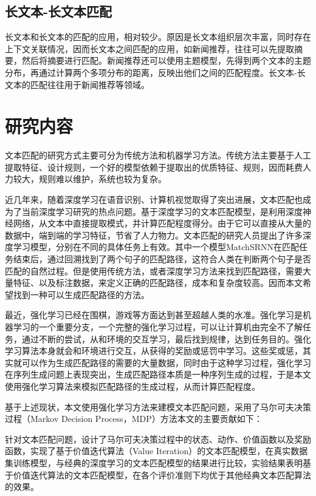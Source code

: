 \subsection{长文本-长文本匹配}
长文本和长文本的匹配的应用，相对较少。原因是长文本组织层次丰富，同时存在上下文关联情况，因而长文本之间匹配的应用，如新闻推荐，往往可以先提取摘要，然后将摘要进行匹配。新闻推荐还可以使用主题模型，先得到两个文本的主题分布，再通过计算两个多项分布的距离，反映出他们之间的匹配程度。长文本-长文本的匹配往往用于新闻推荐等领域。


\section{研究内容}

文本匹配的研究方式主要可分为传统方法和机器学习方法。传统方法主要基于人工提取特征、设计规则，一个好的模型依赖于提取出的优质特征、规则，因而耗费人力较大，规则难以维护，系统也较为复杂。

近几年来，随着深度学习在语音识别、计算机视觉取得了突出进展，文本匹配也成为了当前深度学习研究的热点问题。基于深度学习的文本匹配模型，是利用深度神经网络，从文本中直接提取模式，并计算匹配程度得分。由于它可以直接从大量的数据中，端到端的学习特征，节省了人力物力。文本匹配的研究人员提出了许多深度学习模型，分别在不同的具体任务上有效。其中一个模型MatchSRNN在匹配任务结束后，通过回溯找到了两个句子的匹配路径，这符合人类在判断两个句子是否匹配的自然过程。但是使用传统方法，或者深度学习方法来找到匹配路径，需要大量特征、以及标注数据，来定义正确的匹配路径，成本和复杂度较高。因而本文希望找到一种可以生成匹配路径的方法。

最近，强化学习已经在围棋，游戏等方面达到甚至超越人类的水准。强化学习是机器学习的一个重要分支，一个完整的强化学习过程，可以让计算机由完全不了解任务，通过不断的尝试，从和环境的交互学习，最后找到规律，达到任务目的。强化学习算法本身就会和环境进行交互，从获得的奖励或惩罚中学习。这些奖或惩，其实就可以作为生成匹配路径的需要的大量数据，同时由于这种学习过程，强化学习在序列生成问题上表现突出，生成匹配路径本质是一种序列生成的过程，于是本文使用强化学习算法来模拟匹配路径的生成过程，从而计算匹配程度。

基于上述现状，本文使用强化学习方法来建模文本匹配问题，采用了马尔可夫决策过程（Markov Decision Process，MDP）方法本文的主要贡献如下：

针对文本匹配问题，设计了马尔可夫决策过程中的状态、动作、价值函数以及奖励函数，实现了基于价值迭代算法（Value Iteration）的文本匹配模型，在真实数据集训练模型，与经典的深度学习的文本匹配模型的结果进行比较，实验结果表明基于价值迭代算法的文本匹配模型，在各个评价准则下均优于其他经典文本匹配算法的效果。


